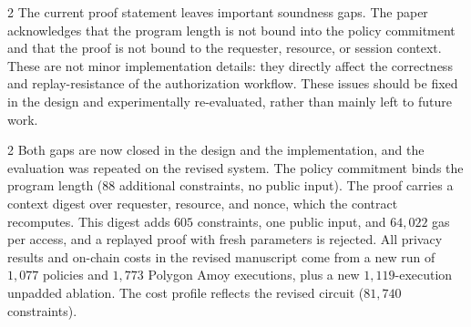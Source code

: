 \begin{reviewcomment}{2}
	The current proof statement leaves important soundness gaps.
	The paper acknowledges that the program length is not bound into the policy commitment and that the proof is not bound to the requester, resource, or session context.
	These are not minor implementation details: they directly affect the correctness and replay-resistance of the authorization workflow.
	These issues should be fixed in the design and experimentally re-evaluated, rather than mainly left to future work.
\end{reviewcomment}

\begin{reviewresponse}{2}
	Both gaps are now closed in the design and the implementation, and the evaluation was repeated on the revised system.
	The policy commitment binds the program length ($88$ additional constraints, no public input).
	The proof carries a context digest over requester, resource, and nonce, which the contract recomputes.
	This digest adds $605$ constraints, one public input, and $64{,}022$ gas per access, and a replayed proof with fresh parameters is rejected.
	All privacy results and on-chain costs in the revised manuscript come from a new run of $1{,}077$ policies and $1{,}773$ Polygon Amoy executions, plus a new $1{,}119$-execution unpadded ablation.
	The cost profile reflects the revised circuit ($81{,}740$ constraints).

\end{reviewresponse}
